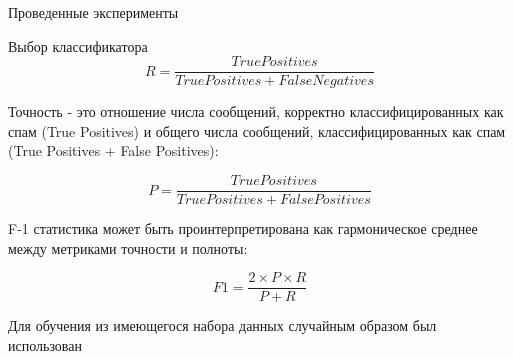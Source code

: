 \begin{section}{Проведенные эксперименты}
\begin{subsection}{Выбор классификатора}
\begin{equation}
  R = \frac{True Positives}{True Positives + False Negatives}
\end{equation}

Точность - это отношение числа сообщений, корректно классифицированных как спам (True Positives) и общего числа  сообщений, классифицированных как спам (True Positives + False Positives):

\begin{equation}
  P = \frac{True Positives}{True Positives + False Positives}
\end{equation}

F-1 статистика может быть проинтерпретирована как гармоническое среднее между метриками точности и полноты:

\begin{equation}
  F1 = \frac{2 \times P \times R}{P + R}
\end{equation}



Для обучения из имеющегося набора данных случайным образом был использован







\begin{table}[H]
\centering
{}

\caption{Сравнение показателей классификатора}
\label{tab:results}
\end{table}




\begin{table}[H]
\centering
{}

\caption{Время вычисления признаков}
\label{tab:comptime}
\end{table}



\end{subsection}


\end{section}
